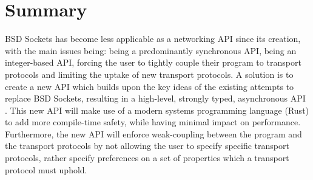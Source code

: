 \section{Summary}\label{sec:summary}
BSD Sockets has become less applicable as a networking API since its creation, with the main issues being: being a
predominantly synchronous API, being an integer-based API, forcing the user to tightly couple their program to
transport protocols and limiting the uptake of new transport protocols.
A solution is to create a new API which builds upon the key ideas of the existing attempts to replace BSD Sockets,
resulting in a high-level, strongly typed, asynchronous API .
This new API will make use of a modern systems programming language (Rust) to add more compile-time safety, while having
minimal impact on performance.
Furthermore, the new API will enforce weak-coupling between the program and the transport protocols by not allowing the
user to specify specific transport protocols, rather specify preferences on a set of properties which a transport
protocol must uphold.



